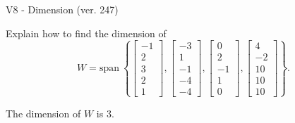 \begin{exercise}
  \begin{exerciseTitle}V8 - Dimension (ver. 247)\end{exerciseTitle}
  \begin{exerciseStatement}
    Explain how to find the dimension of 
\[W=\mathrm{span}\ \left\{\left[\begin{array}{r}
-1 \\
2 \\
3 \\
2 \\
1
\end{array}\right] , \left[\begin{array}{r}
-3 \\
1 \\
-1 \\
-4 \\
-4
\end{array}\right] , \left[\begin{array}{r}
0 \\
2 \\
-1 \\
1 \\
0
\end{array}\right] , \left[\begin{array}{r}
4 \\
-2 \\
10 \\
10 \\
10
\end{array}\right]\right\}.\]



  \end{exerciseStatement}
  \begin{exerciseAnswer}
   The dimension of \(W\) is  \(3\).
  


  \end{exerciseAnswer}
\end{exercise}